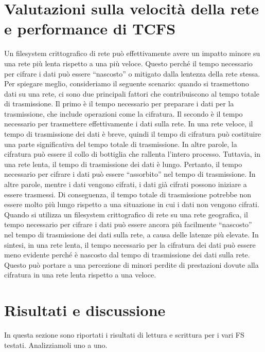 \section{Valutazioni sulla velocità della rete e performance di TCFS}
Un filesystem crittografico di rete può effettivamente avere un impatto minore su una rete più lenta rispetto a una più veloce. Questo perché il tempo necessario per cifrare i dati può essere “nascosto” o mitigato dalla lentezza della rete stessa. Per spiegare meglio, consideriamo il seguente scenario: quando si trasmettono dati su una rete, ci sono due principali fattori che contribuiscono al tempo totale di trasmissione. Il primo è il tempo necessario per preparare i dati per la trasmissione, che include operazioni come la cifratura. Il secondo è il tempo necessario per trasmettere effettivamente i dati sulla rete. In una rete veloce, il tempo di trasmissione dei dati è breve, quindi il tempo di cifratura può costituire una parte significativa del tempo totale di trasmissione. In altre parole, la cifratura può essere il collo di bottiglia che rallenta l’intero processo. Tuttavia, in una rete lenta, il tempo di trasmissione dei dati è lungo. Pertanto, il tempo necessario per cifrare i dati può essere “assorbito” nel tempo di trasmissione. In altre parole, mentre i dati vengono cifrati, i dati già cifrati possono iniziare a essere trasmessi. Di conseguenza, il tempo totale di trasmissione potrebbe non essere molto più lungo rispetto a una situazione in cui i dati non vengono cifrati. Quando si utilizza un filesystem crittografico di rete su una rete geografica, il tempo necessario per cifrare i dati può essere ancora più facilmente “nascosto” nel tempo di trasmissione dei dati sulla rete, a causa delle latenze più elevate. In sintesi, in una rete lenta, il tempo necessario per la cifratura dei dati può essere meno evidente perché è nascosto dal tempo di trasmissione dei dati sulla rete. Questo può portare a una percezione di minori perdite di prestazioni dovute alla cifratura in una rete lenta rispetto a una veloce.

\section{Risultati e discussione} 
In questa sezione sono riportati i risultati di lettura e scrittura per i vari FS testati. Analizziamoli uno a uno.


